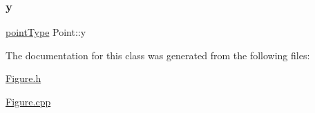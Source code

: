 \mbox{\label{class_point_ae818271b839c768a11dfff7f3bf27b08}} 
\subsubsection{\texorpdfstring{y}{y}}
{\footnotesize\ttfamily \hyperlink{class_point_a00b37528c0db634a12ecee9b29d79579}{point\+Type} Point\+::y}



The documentation for this class was generated from the following files\+:\begin{DoxyCompactItemize}
\item 
\hyperlink{_figure_8h}{Figure.\+h}\item 
\hyperlink{_figure_8cpp}{Figure.\+cpp}\end{DoxyCompactItemize}
